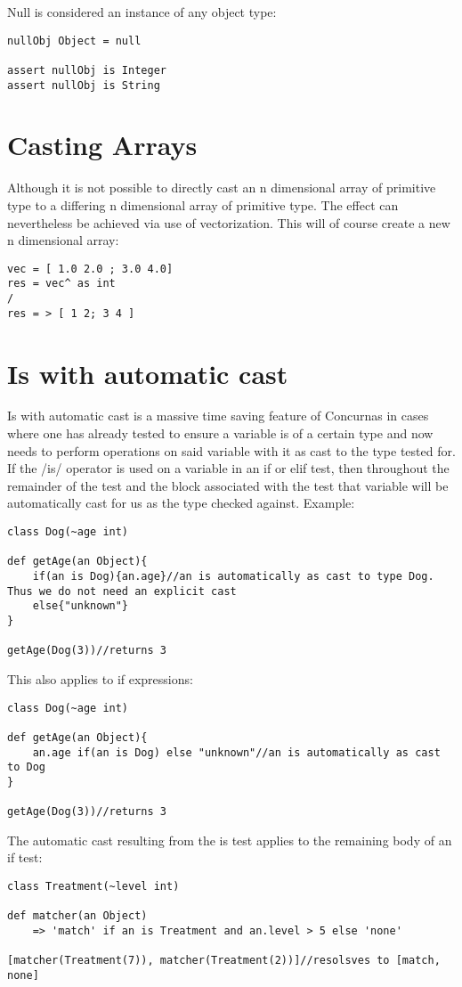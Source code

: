 \documentclass[conc-doc]{subfiles}
\begin{document}
Null is considered an instance of any object type:
\begin{lstlisting}
nullObj Object = null

assert nullObj is Integer
assert nullObj is String
\end{lstlisting}

\section{Casting Arrays}

Although it is not possible to directly cast an n dimensional array of primitive type to a differing n dimensional array of primitive type. The effect can nevertheless be achieved via use of vectorization. This will of course create a new n dimensional array:
\begin{lstlisting}
vec = [ 1.0 2.0 ; 3.0 4.0]
res = vec^ as int
/
res = > [ 1 2; 3 4 ]
\end{lstlisting}

\section{Is with automatic cast}
Is with automatic cast is a massive time saving feature of Concurnas in cases where one has already tested to ensure a variable is of a certain type and now needs to perform operations on said variable with it as cast to the type tested for. If the /is/ operator is used on a variable in an if or elif test, then throughout the remainder of the test and the block associated with the test that variable will be automatically cast for us as the type checked against. Example:
\begin{lstlisting}
class Dog(~age int)

def getAge(an Object){
	if(an is Dog){an.age}//an is automatically as cast to type Dog. Thus we do not need an explicit cast
	else{"unknown"}
}

getAge(Dog(3))//returns 3
\end{lstlisting}

This also applies to if expressions:
\begin{lstlisting}
class Dog(~age int)

def getAge(an Object){
	an.age if(an is Dog) else "unknown"//an is automatically as cast to Dog 
}

getAge(Dog(3))//returns 3
\end{lstlisting}

The automatic cast resulting from the is test applies to the remaining body of an if test:
\begin{lstlisting}
class Treatment(~level int)

def matcher(an Object) 
	=> 'match' if an is Treatment and an.level > 5 else 'none'

[matcher(Treatment(7)), matcher(Treatment(2))]//resolsves to [match, none]
\end{lstlisting}
\end{document}
